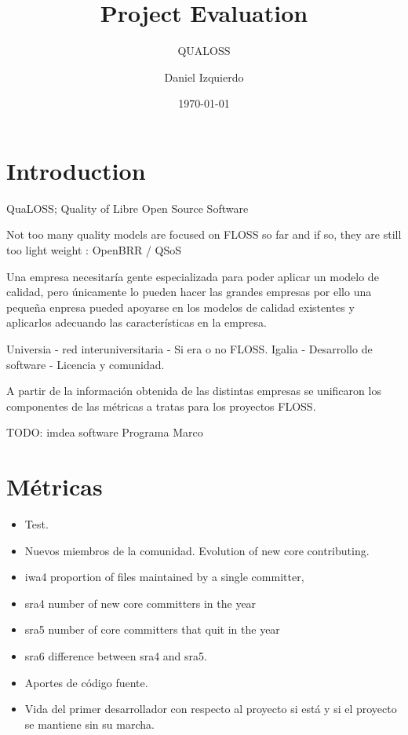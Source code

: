 \documentclass[11pt]{scrartcl}
\title{\textbf{Project Evaluation}}
\subtitle{QUALOSS}
\author{Daniel Izquierdo}
\date{\today}
\begin{document}
\maketitle

\section{Introduction}

QuaLOSS; Quality of Libre Open Source Software

Not too many quality models are focused on FLOSS so far and if so, they are 
still too light weight : OpenBRR / QSoS

Una empresa necesitaría gente especializada para poder aplicar un modelo de 
calidad, pero únicamente lo pueden hacer las grandes empresas por ello una 
pequeña enpresa pueded apoyarse en los modelos de calidad existentes y 
aplicarlos adecuando las características en la empresa.

Universia - red interuniversitaria - Si era o no FLOSS.
Igalia - Desarrollo de software - Licencia y comunidad.

A partir de la información obtenida de las distintas empresas se unificaron los 
componentes de las métricas a tratas para los proyectos FLOSS.

TODO: imdea software
      Programa Marco

\section{Métricas}

\begin{itemize}
    \item Test. 
    \item Nuevos miembros de la comunidad. Evolution of new core contributing. 
    \item iwa4 proportion of files maintained by a single committer,
    \item sra4 number of new core committers in the year
    \item sra5 number of core committers that quit in the year
    \item sra6 difference between sra4 and sra5.
    \item Aportes de código fuente.
    \item Vida del primer desarrollador con respecto al proyecto si está y si el proyecto se mantiene sin su marcha.
\end{itemize}

\section{}
\end{document}
